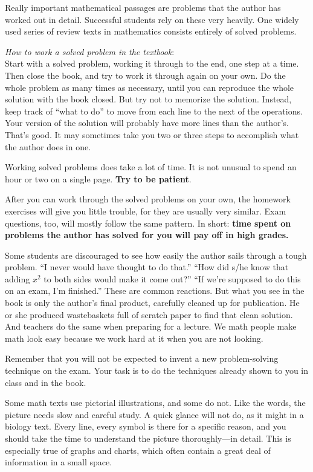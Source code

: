 \documentclass[../main.tex]{subfiles}
\begin{document}
Really important mathematical passages are problems that the author has worked
out in detail. Successful students rely on these very heavily. One widely used series of
review texts in mathematics consists entirely of solved problems.

\emph{How to work a solved problem in the textbook}: \\
Start with a solved problem, working it through to the end, one step at a time.
Then close the book, and try to work it through again on your own. Do the whole
problem as many times as necessary, until you can reproduce the whole solution with the
book closed. But try not to memorize the solution. Instead, keep track of ``what to do'' to
move from each line to the next of the operations. Your version of the solution will
probably have more lines than the author's. That's good. It may sometimes take you two
or three steps to accomplish what the author does in one.

Working solved problems does take a lot of time. It is not unusual to spend an
hour or two on a single page. \textbf{Try to be patient}.

After you can work through the solved problems on your own, the homework
exercises will give you little trouble, for they are usually very similar. Exam questions,
too, will mostly follow the same pattern. In short:
\textbf{time spent on problems the author has solved for you will pay off in high grades.}

Some students are discouraged to see how easily the author sails through a tough
problem. ``I never would have thought to do that.'' ``How did s/he know that
adding $ x^2 $ to both sides would make it come out?'' ``If we're supposed to do this on an exam, I'm
finished.'' These are common reactions. But what you see in the book is only the
author's final product, carefully cleaned up for publication. He or she produced
wastebaskets full of scratch paper to find that clean solution. And teachers do the same
when preparing for a lecture. We math people make math look easy because we work
hard at it when you are not looking.

Remember that you will not be expected to invent a new problem-solving
technique on the exam. Your task is to do the techniques already shown to you in class
and in the book.

Some math texts use pictorial illustrations, and some do not. Like the words, the
picture needs slow and careful study. A quick glance will not do, as it might in a biology
text. Every line, every symbol is there for a specific reason, and you should take the time
to understand the picture thoroughly---in detail. This is especially true of graphs and
charts, which often contain a great deal of information in a small space.
\end{document}
